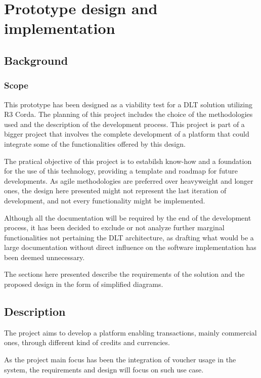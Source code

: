 \chapter{Prototype design and implementation}
\label{chap:prototype-design}

\section{Background}

\subsection{Scope}

This prototype has been designed as a viability test for a DLT solution utilizing R3 Corda. 
The planning of this project includes the choice of the methodologies used and the description of the development process.
This project is part of a bigger project that involves the complete development of a platform that could integrate some of the functionalities offered by this design.

The pratical objective of this project is to estabilsh know-how and a foundation for the use of this technology, providing a template and roadmap for future developments. As agile methodologies are preferred over heavyweight and longer ones, the design here presented might not represent the last iteration of development, and not every functionality might be implemented.

Although all the documentation will be required by the end of the development process, it has been decided to exclude or not analyze further marginal functionalities not pertaining the DLT architecture, as drafting what would be a large documentation without direct influence on the software implementation has been deemed unnecessary.

The sections here presented describe the requirements of the solution and the proposed design in the form of simplified diagrams.

\section{Description}

The project aims to develop a platform enabling transactions, mainly commercial ones, through different kind of credits and currencies. 

As the project main focus has been the integration of voucher usage in the system, the requirements and design will focus on such use case.


